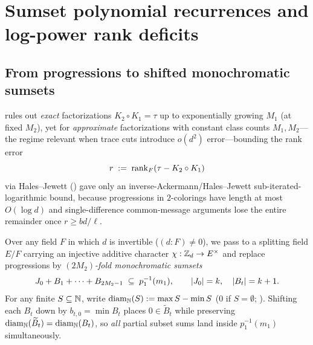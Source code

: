 \section{Sumset polynomial recurrences and log-power rank deficits}\label{sec:sumsets}

\subsection{From progressions to shifted monochromatic sumsets}\label{sec:sumsets-step1}

 rules out \emph{exact} factorizations $K_2 \circ K_1 = \tau$ up to exponentially
growing $M_1$ (at fixed $M_2$), yet for \emph{approximate} factorizations with constant class counts
$M_1, M_2$---the regime relevant when trace cuts introduce $o(d^2)$ error---bounding the rank error
\[
  r \;:=\; \operatorname{rank}_F(\tau - K_2 \circ K_1)
\]
via Hales--Jewett (\cite[Theorem~6.6]{SharedDecoders2026}) gave only an inverse-Ackermann/Hales--Jewett
sub-iterated-logarithmic bound, because progressions in $2$-colorings have length at most $O(\log d)$
and single-difference common-message arguments lose the entire remainder once $r \ge bd/\ell$.

Over any field $F$ in which $d$ is invertible ($(d : F) \ne 0$), we pass to a splitting field $E/F$
carrying an injective additive character $\chi : \mathbb{Z}_d \to E^\times$ and replace progressions by
\emph{$(2M_2)$-fold monochromatic sumsets}
\[
  J_0 + B_1 + \cdots + B_{2M_2 - 1} \;\subseteq\; p_1^{-1}(m_1),
  \qquad
  \lvert J_0 \rvert = k,\quad \lvert B_t \rvert = k + 1.
\]
For any finite $S \subseteq \mathbb{N}$, write $\operatorname{diam}_{\mathbb{N}}(S) := \max S - \min S$ ($0$ if $S = \emptyset$;
). Shifting each $B_t$ down by $b_{t,0} = \min B_t$ places $0 \in \widetilde{B}_t$
while preserving $\operatorname{diam}_{\mathbb{N}}(\widetilde{B}_t) = \operatorname{diam}_{\mathbb{N}}(B_t)$, so \emph{all} partial subset sums
land inside $p_1^{-1}(m_1)$ simultaneously.

